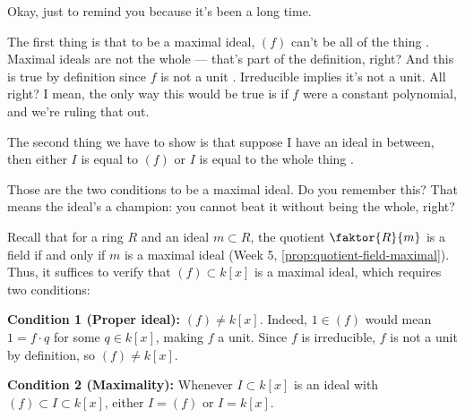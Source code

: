 \begin{proofWrapper}

\begin{hidden}
\end{hidden}

\begin{speech}[01:04:39 - 01:05:54]
Okay, just to remind you because it's been a long time.

The first thing is that to be a maximal ideal, $(f)$ can't be all of the thing . Maximal ideals are not the whole --- that's part of the definition, right? And this is true by definition since $f$ is not a unit . Irreducible implies it's not a unit. All right? I mean, the only way this would be true is if $f$ were a constant polynomial, and we're ruling that out.

The second thing we have to show is that suppose I have an ideal in between, then either $I$ is equal to $(f)$ or $I$ is equal to the whole thing .

Those are the two conditions to be a maximal ideal. Do you remember this? That means the ideal's a champion: you cannot beat it without being the whole, right?
\end{speech}

\begin{content}
Recall that for a ring $R$ and an ideal $m \subset R$, the quotient $\faktor{R}{m}$ is a field if and only if $m$ is a maximal ideal (Week 5, \cref{prop:quotient-field-maximal}). Thus, it suffices to verify that $(f) \subset k[x]$ is a maximal ideal, which requires two conditions:

\textbf{Condition 1 (Proper ideal):} $(f) \neq k[x]$.
Indeed, $1 \in (f)$ would mean $1 = f \cdot q$ for some $q \in k[x]$, making $f$ a unit. Since $f$ is irreducible, $f$ is not a unit by definition, so $(f) \neq k[x]$.

\textbf{Condition 2 (Maximality):} Whenever $I \subset k[x]$ is an ideal with $(f) \subset I \subset k[x]$, either $I = (f)$ or $I = k[x]$.
\end{content}


\end{proofWrapper}
